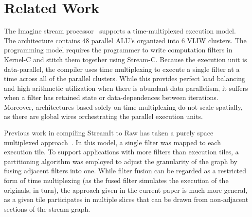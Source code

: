 \section{Related Work}
\label{sec:related}

The Imagine stream processor~\cite{rixner98bandwidthefficient}
supports a time-multiplexed execution model.  The architecture
contains 48 parallel ALU's organized into 6 VLIW clusters.  The
programming model requires the programmer to write computation filters
in Kernel-C and stitch them together using Stream-C.  Because the
execution unit is data-parallel, the compiler uses time multiplexing
to execute a single filter at a time across all of the parallel
clusters.  While this provides perfect load balancing and high
arithmetic utilization when there is abundant data parallelism, it
suffers when a filter has retained state or data-dependences between
iterations.  Moreover, architectures based solely on
time-multiplexing do not scale spatially, as there are global wires
orchestrating the parallel execution units. 

Previous work in compiling StreamIt to Raw has taken a purely space
multiplexed approach~\cite{streamit-asplos}.  In this model, a single
filter was mapped to each execution tile.  To support applications
with more filters than execution tiles, a partitioning algorithm was
employed to adjust the granularity of the graph by fusing adjacent
filters into one.  While filter fusion can be regarded as a restricted
form of time multiplexing (as the fused filter simulates the execution
of the originals, in turn), the approach given in the current paper is
much more general, as a given tile participates in multiple slices
that can be drawn from non-adjacent sections of the stream graph.


